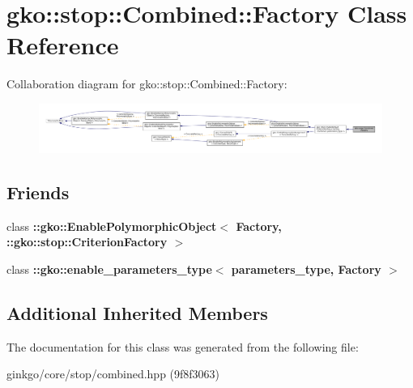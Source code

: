 \hypertarget{classgko_1_1stop_1_1Combined_1_1Factory}{}\section{gko\+:\+:stop\+:\+:Combined\+:\+:Factory Class Reference}
\label{classgko_1_1stop_1_1Combined_1_1Factory}


Collaboration diagram for gko\+:\+:stop\+:\+:Combined\+:\+:Factory\+:
\nopagebreak
\begin{figure}[H]
\begin{center}
\leavevmode
\includegraphics[width=350pt]{classgko_1_1stop_1_1Combined_1_1Factory__coll__graph}
\end{center}
\end{figure}
\subsection*{Friends}
\begin{DoxyCompactItemize}
\item 
\mbox{\label{classgko_1_1stop_1_1Combined_1_1Factory_aaa5507cf00e5361a77971746fefa42e6}} 
class {\bfseries \+::gko\+::\+Enable\+Polymorphic\+Object$<$ Factory, \+::gko\+::stop\+::\+Criterion\+Factory $>$}
\item 
\mbox{\label{classgko_1_1stop_1_1Combined_1_1Factory_a0d176cbd42d6214e11aee8c30ca256fc}} 
class {\bfseries \+::gko\+::enable\+\_\+parameters\+\_\+type$<$ parameters\+\_\+type, Factory $>$}
\end{DoxyCompactItemize}
\subsection*{Additional Inherited Members}


The documentation for this class was generated from the following file\+:\begin{DoxyCompactItemize}
\item 
ginkgo/core/stop/combined.\+hpp (9f8f3063)\end{DoxyCompactItemize}
